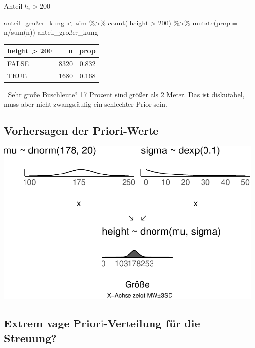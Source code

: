 \documentclass[
  a4paper,
  DIV=11]{scrreprt}
\newenvironment{Shaded}{\begin{snugshade}}{\end{snugshade}}
\newcommand{\AttributeTok}[1]{\textcolor[rgb]{0.40,0.45,0.13}{#1}}
\newcommand{\DecValTok}[1]{\textcolor[rgb]{0.68,0.00,0.00}{#1}}
\newcommand{\FunctionTok}[1]{\textcolor[rgb]{0.28,0.35,0.67}{#1}}
\newcommand{\NormalTok}[1]{\textcolor[rgb]{0.00,0.23,0.31}{#1}}
\newcommand{\OtherTok}[1]{\textcolor[rgb]{0.00,0.23,0.31}{#1}}
\newcommand{\SpecialCharTok}[1]{\textcolor[rgb]{0.37,0.37,0.37}{#1}}
\theoremstyle{definition}
\theoremstyle{remark}
\begin{document}
Anteil \(h_i > 200\):

\begin{Shaded}
\begin{Highlighting}[]
\NormalTok{anteil\_großer\_kung }\OtherTok{\textless{}{-}} 
\NormalTok{sim }\SpecialCharTok{\%\textgreater{}\%} 
  \FunctionTok{count}\NormalTok{( height }\SpecialCharTok{\textgreater{}} \DecValTok{200}\NormalTok{) }\SpecialCharTok{\%\textgreater{}\%} 
  \FunctionTok{mutate}\NormalTok{(}\AttributeTok{prop =}\NormalTok{ n}\SpecialCharTok{/}\FunctionTok{sum}\NormalTok{(n))}
\NormalTok{anteil\_großer\_kung}
\end{Highlighting}
\end{Shaded}

\begin{longtable}[]{@{}lrr@{}}
\toprule()
height \textgreater{} 200 & n & prop \\
\midrule()
\endhead
FALSE & 8320 & 0.832 \\
TRUE & 1680 & 0.168 \\
\bottomrule()
\end{longtable}

🤔 Sehr große Buschleute? 17 Prozent sind größer als 2 Meter. Das ist
diskutabel, muss aber nicht zwangsläufig ein schlechter Prior sein.

\hypertarget{vorhersagen-der-priori-werte}{%
\subsection{Vorhersagen der
Priori-Werte}\label{vorhersagen-der-priori-werte}}

\includegraphics{./gauss_files/figure-pdf/Kung-15-1.pdf}

\hypertarget{extrem-vage-priori-verteilung-fuxfcr-die-streuung}{%
\subsection{Extrem vage Priori-Verteilung für die
Streuung?}\label{extrem-vage-priori-verteilung-fuxfcr-die-streuung}}
\end{document}
